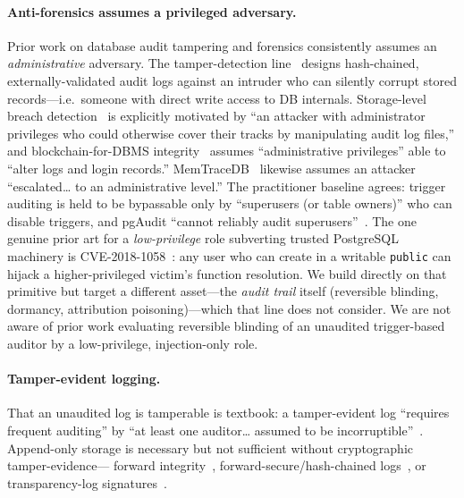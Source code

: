 \documentclass[11pt]{article}
\newcommand{\code}[1]{\texttt{#1}}
\begin{document}
\paragraph{Anti-forensics assumes a privileged adversary.}
Prior work on database audit tampering and forensics consistently assumes an
\emph{administrative} adversary. The tamper-detection line~\cite{snodgrass2004,pavlou2008}
designs hash-chained, externally-validated audit logs against an intruder who can silently
corrupt stored records---i.e.\ someone with direct write access to DB internals. Storage-level
breach detection~\cite{wagner2017} is explicitly motivated by ``an attacker with administrator
privileges who could otherwise cover their tracks by manipulating audit log files,'' and
blockchain-for-DBMS integrity~\cite{verity2019} assumes ``administrative privileges'' able to
``alter logs and login records.'' MemTraceDB~\cite{memtracedb} likewise assumes an attacker
``escalated\ldots{} to an administrative level.'' The practitioner baseline agrees: trigger
auditing is held to be bypassable only by ``superusers (or table owners)'' who can disable
triggers, and pgAudit ``cannot reliably audit superusers''~\cite{pgaudit}. The one genuine prior
art for a \emph{low-privilege} role subverting trusted PostgreSQL machinery is
CVE-2018-1058~\cite{pgsec2018}: any user who can create in a writable \code{public} can hijack a
higher-privileged victim's function resolution. We build directly on that primitive but target a
different asset---the \emph{audit trail} itself (reversible blinding, dormancy, attribution
poisoning)---which that line does not consider. We are not aware of prior work evaluating
reversible blinding of an unaudited trigger-based auditor by a low-privilege, injection-only role.

\paragraph{Tamper-evident logging.}
That an unaudited log is tamperable is textbook: a tamper-evident log ``requires frequent
auditing'' by ``at least one auditor\ldots{} assumed to be incorruptible''~\cite{crosby2009}.
Append-only storage is necessary but not sufficient without cryptographic tamper-evidence---%
forward integrity~\cite{bellare1997}, forward-secure/hash-chained logs~\cite{schneier1998},
or transparency-log signatures~\cite{rfc6962}.
\end{document}
